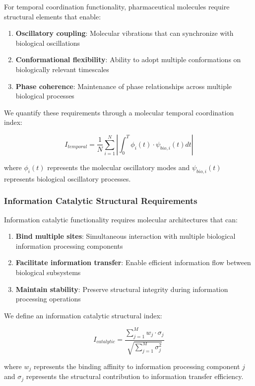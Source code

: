 \documentclass[12pt,a4paper]{article}
\begin{document}
For temporal coordination functionality, pharmaceutical molecules require structural elements that enable:

\begin{enumerate}
\item \textbf{Oscillatory coupling}: Molecular vibrations that can synchronize with biological oscillations
\item \textbf{Conformational flexibility}: Ability to adopt multiple conformations on biologically relevant timescales  
\item \textbf{Phase coherence}: Maintenance of phase relationships across multiple biological processes
\end{enumerate}

We quantify these requirements through a molecular temporal coordination index:

$$I_{temporal} = \frac{1}{N} \sum_{i=1}^{N} \left|\int_0^T \phi_i(t) \cdot \psi_{bio,i}(t) dt\right|$$

where $\phi_i(t)$ represents the molecular oscillatory modes and $\psi_{bio,i}(t)$ represents biological oscillatory processes.

\subsubsection{Information Catalytic Structural Requirements}

Information catalytic functionality requires molecular architectures that can:

\begin{enumerate}
\item \textbf{Bind multiple sites}: Simultaneous interaction with multiple biological information processing components
\item \textbf{Facilitate information transfer}: Enable efficient information flow between biological subsystems
\item \textbf{Maintain stability}: Preserve structural integrity during information processing operations
\end{enumerate}

We define an information catalytic structural index:

$$I_{catalytic} = \frac{\sum_{j=1}^{M} w_j \cdot \sigma_j}{\sqrt{\sum_{j=1}^{M} \sigma_j^2}}$$

where $w_j$ represents the binding affinity to information processing component $j$ and $\sigma_j$ represents the structural contribution to information transfer efficiency.
\end{document}
